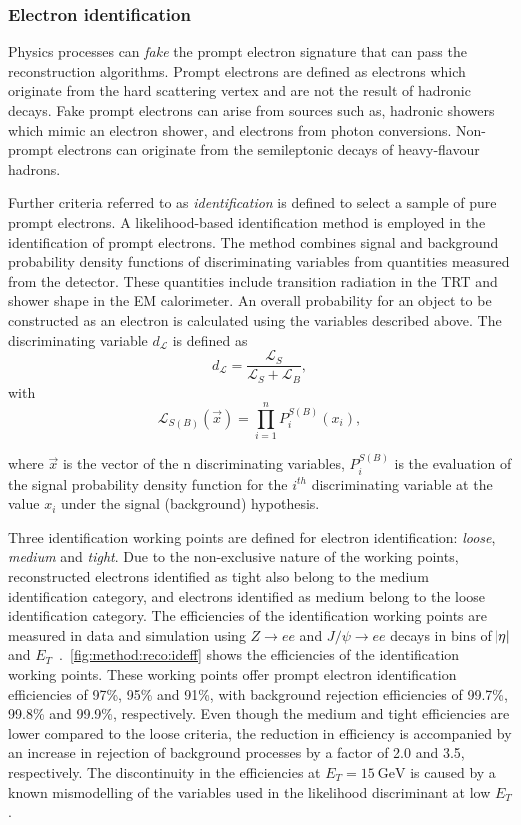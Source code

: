 \subsubsection{Electron identification}
Physics processes can \emph{fake} the prompt electron signature that can pass the reconstruction algorithms. Prompt electrons are defined as electrons which originate from the hard scattering vertex and are not the result of hadronic decays. Fake prompt electrons can arise from sources such as, hadronic showers which mimic an electron shower, and electrons from photon conversions. Non-prompt electrons can originate from the semileptonic decays of heavy-flavour hadrons.

Further criteria referred to as \emph{identification} is defined to select a sample of pure prompt electrons. A likelihood-based identification method is employed in the identification of prompt electrons. The method combines signal and background probability density functions of discriminating variables from quantities measured from the detector. These quantities include transition radiation in the TRT and shower shape in the EM calorimeter. An overall probability for an object to be constructed as an electron is calculated using the variables described above. The discriminating variable $d_\mathcal{L}$ is defined as
\begin{equation}
    d_{\mathcal{L}} = \frac{\mathcal{L}_S}{\mathcal{L}_S + \mathcal{L}_B},  
\end{equation}
with 
\begin{equation}
    \mathcal{L}_{S(B)}(\overrightarrow{x}) = \prod_{i=1}^{n} P_{i}^{S(B)} (x_{i}),
\end{equation}

where $\overrightarrow{x}$ is the vector of the n discriminating variables, $P_{i}^{S(B)}$ is the evaluation of the signal probability density function for the $i^{th}$ discriminating variable at the value $x_i$ under the signal (background) hypothesis. 

Three identification working points are defined for electron identification: \emph{loose}, \emph{medium} and \emph{tight}. Due to the non-exclusive nature of the working points, reconstructed electrons identified as tight also belong to the medium identification category, and electrons identified as medium belong to the loose identification category. The efficiencies of the identification working points are measured in data and simulation using $Z \rightarrow ee$ and $J/\psi \rightarrow ee$ decays in bins of $\abs{\eta}$ and $E_T$~\cite{Aad:2019tso}.~\cref{fig:method:reco:ideff} shows the efficiencies of the identification working points. These working points offer prompt electron identification efficiencies of 97\%, 95\% and 91\%, with background rejection efficiencies of 99.7\%, 99.8\% and 99.9\%, respectively. Even though the medium and tight efficiencies are lower compared to the loose criteria, the reduction in efficiency is accompanied by an increase in rejection of background processes by a factor of 2.0 and 3.5, respectively. The discontinuity in the efficiencies at $E_T = \SI{15}{\giga\electronvolt}$ is caused by a known mismodelling of the variables used in the likelihood discriminant at low $E_T$. 

